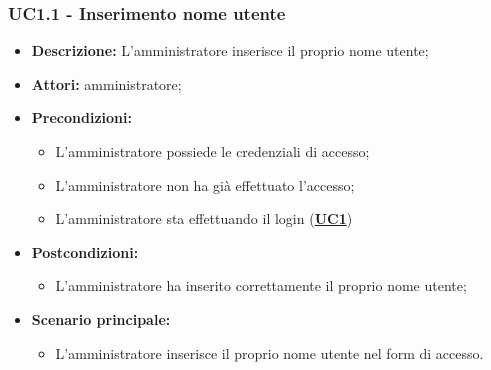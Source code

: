 \subsubsection{UC1.1 - Inserimento nome utente}
\label{sec:UC1.1}
\begin{itemize}
	\item \textbf{Descrizione:} L’amministratore inserisce il proprio nome utente;
	\item \textbf{Attori:} amministratore;
	\item \textbf{Precondizioni:} 
	\begin{itemize}
		\item L’amministratore possiede le credenziali di accesso;
		\item L’amministratore non ha già effettuato l’accesso;
		\item L’amministratore sta effettuando il login (\hyperref[sec:UC1]{\textbf{UC1}})
	\end{itemize}
	\item \textbf{Postcondizioni:} 
	\begin{itemize}
		\item L’amministratore ha inserito correttamente il proprio nome utente;
	\end{itemize}
	\item \textbf{Scenario principale:} 
	\begin{itemize}
		\item L’amministratore inserisce il proprio nome utente nel form di accesso.
	\end{itemize}
\end{itemize}


